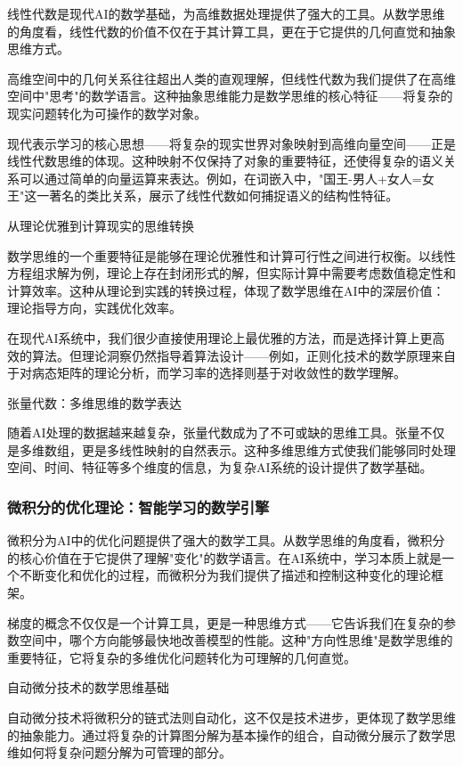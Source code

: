 线性代数是现代AI的数学基础，为高维数据处理提供了强大的工具。从数学思维的角度看，线性代数的价值不仅在于其计算工具，更在于它提供的几何直觉和抽象思维方式。

高维空间中的几何关系往往超出人类的直观理解，但线性代数为我们提供了在高维空间中"思考"的数学语言。这种抽象思维能力是数学思维的核心特征——将复杂的现实问题转化为可操作的数学对象。

现代表示学习的核心思想——将复杂的现实世界对象映射到高维向量空间——正是线性代数思维的体现。这种映射不仅保持了对象的重要特征，还使得复杂的语义关系可以通过简单的向量运算来表达。例如，在词嵌入中，"国王-男人+女人=女王"这一著名的类比关系，展示了线性代数如何捕捉语义的结构性特征。

从理论优雅到计算现实的思维转换

数学思维的一个重要特征是能够在理论优雅性和计算可行性之间进行权衡。以线性方程组求解为例，理论上存在封闭形式的解，但实际计算中需要考虑数值稳定性和计算效率。这种从理论到实践的转换过程，体现了数学思维在AI中的深层价值：理论指导方向，实践优化效率。

在现代AI系统中，我们很少直接使用理论上最优雅的方法，而是选择计算上更高效的算法。但理论洞察仍然指导着算法设计——例如，正则化技术的数学原理来自于对病态矩阵的理论分析，而学习率的选择则基于对收敛性的数学理解。

张量代数：多维思维的数学表达

随着AI处理的数据越来越复杂，张量代数成为了不可或缺的思维工具。张量不仅是多维数组，更是多线性映射的自然表示。这种多维思维方式使我们能够同时处理空间、时间、特征等多个维度的信息，为复杂AI系统的设计提供了数学基础。

\subsubsection{微积分的优化理论：智能学习的数学引擎}

微积分为AI中的优化问题提供了强大的数学工具。从数学思维的角度看，微积分的核心价值在于它提供了理解"变化"的数学语言。在AI系统中，学习本质上就是一个不断变化和优化的过程，而微积分为我们提供了描述和控制这种变化的理论框架。

梯度的概念不仅仅是一个计算工具，更是一种思维方式——它告诉我们在复杂的参数空间中，哪个方向能够最快地改善模型的性能。这种"方向性思维"是数学思维的重要特征，它将复杂的多维优化问题转化为可理解的几何直觉。

自动微分技术的数学思维基础

自动微分技术将微积分的链式法则自动化，这不仅是技术进步，更体现了数学思维的抽象能力。通过将复杂的计算图分解为基本操作的组合，自动微分展示了数学思维如何将复杂问题分解为可管理的部分。

